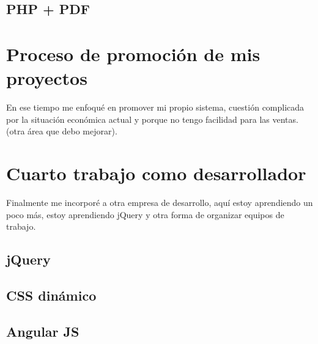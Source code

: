 \documentclass[12pt,spanish,lettersize]{book}
\begin{document}
\subsection{PHP + PDF}
\section{Proceso de promoción de mis proyectos}

En ese tiempo me enfoqué en promover mi propio sistema, cuestión complicada por la situación económica actual y porque no tengo facilidad para las ventas. (otra área que debo mejorar).\\

\section{Cuarto trabajo como desarrollador}

Finalmente me incorporé a otra empresa de desarrollo, aquí estoy aprendiendo un poco más, estoy aprendiendo jQuery y otra forma de organizar equipos de trabajo.
\subsection{jQuery}
\subsection{CSS dinámico}
\subsection{Angular JS}
\end{document}
